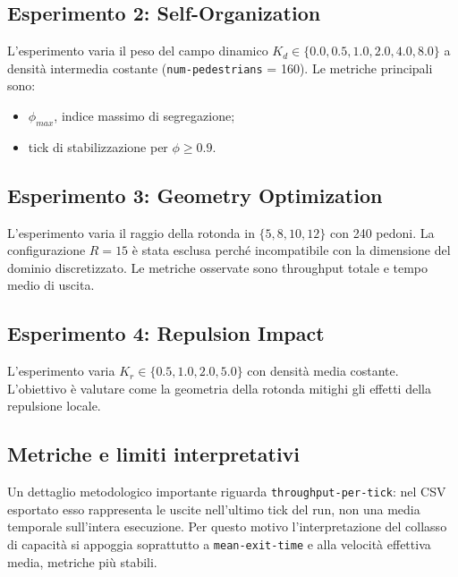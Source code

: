 \subsection{Esperimento 2: Self-Organization}
L'esperimento varia il peso del campo dinamico $K_d \in \{0.0,0.5,1.0,2.0,4.0,8.0\}$ a densità intermedia costante (\texttt{num-pedestrians} = 160). Le metriche principali sono:
\begin{itemize}
\item $\phi_{max}$, indice massimo di segregazione;
\item tick di stabilizzazione per $\phi \geq 0.9$.
\end{itemize}

\subsection{Esperimento 3: Geometry Optimization}
L'esperimento varia il raggio della rotonda in $\{5,8,10,12\}$ con 240 pedoni. La configurazione $R = 15$ è stata esclusa perché incompatibile con la dimensione del dominio discretizzato. Le metriche osservate sono throughput totale e tempo medio di uscita.

\subsection{Esperimento 4: Repulsion Impact}
L'esperimento varia $K_r \in \{0.5,1.0,2.0,5.0\}$ con densità media costante. L'obiettivo è valutare come la geometria della rotonda mitighi gli effetti della repulsione locale.

\subsection{Metriche e limiti interpretativi}
Un dettaglio metodologico importante riguarda \texttt{throughput-per-tick}: nel CSV esportato esso rappresenta le uscite nell'ultimo tick del run, non una media temporale sull'intera esecuzione. Per questo motivo l'interpretazione del collasso di capacità si appoggia soprattutto a \texttt{mean-exit-time} e alla velocità effettiva media, metriche più stabili.
